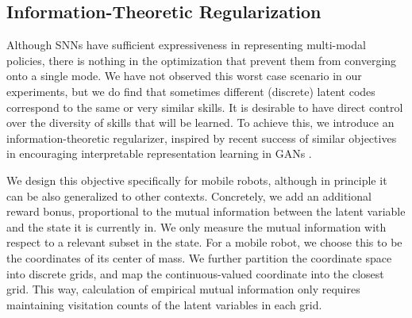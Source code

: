 \documentclass{article} %
\begin{document}





\subsection{Information-Theoretic Regularization}
\label{section:method:inforeg}

Although SNNs have sufficient expressiveness in representing multi-modal policies, there is nothing in the optimization that prevent them from converging onto a single mode. We have not observed this worst case scenario in our experiments, but we do find that sometimes different (discrete) latent codes correspond to the same or very similar skills. It is desirable to have direct control over the diversity of skills that will be learned. To achieve this, we introduce an information-theoretic regularizer, inspired by recent success of similar objectives in encouraging interpretable representation learning in GANs \citep{chen2016infogan}.

We design this objective specifically for mobile robots, although in principle it can be also generalized to other contexts.
Concretely, we add an additional reward bonus, proportional to the mutual information between the latent variable and the state it is currently in. We only measure the mutual information with respect to a relevant subset in the state. For a mobile robot, we choose this to be the coordinates of its center of mass. We further partition the coordinate space into discrete grids, and map the continuous-valued coordinate into the closest grid. This way, calculation of empirical mutual information only requires maintaining visitation counts of the latent variables in each grid.
\end{document}
